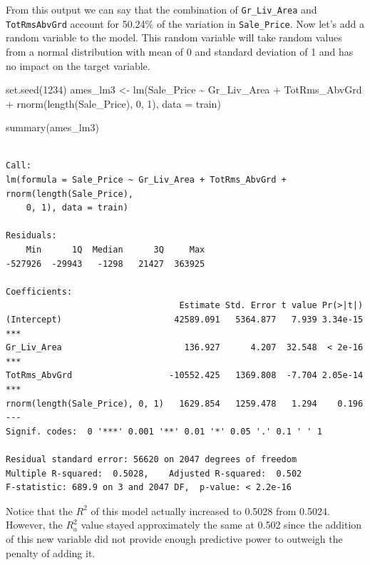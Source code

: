 \documentclass[
  letterpaper,
  DIV=11,
  numbers=noendperiod]{scrreprt}
\newenvironment{Shaded}{\begin{snugshade}}{\end{snugshade}}
\newcommand{\AttributeTok}[1]{\textcolor[rgb]{0.40,0.45,0.13}{#1}}
\newcommand{\DecValTok}[1]{\textcolor[rgb]{0.68,0.00,0.00}{#1}}
\newcommand{\FunctionTok}[1]{\textcolor[rgb]{0.28,0.35,0.67}{#1}}
\newcommand{\NormalTok}[1]{\textcolor[rgb]{0.00,0.23,0.31}{#1}}
\newcommand{\OtherTok}[1]{\textcolor[rgb]{0.00,0.23,0.31}{#1}}
\newcommand{\SpecialCharTok}[1]{\textcolor[rgb]{0.37,0.37,0.37}{#1}}
\begin{document}
From this output we can say that the combination of
\texttt{Gr\_Liv\_Area} and \texttt{TotRmsAbvGrd} account for 50.24\% of
the variation in \texttt{Sale\_Price}. Now let's add a random variable
to the model. This random variable will take random values from a normal
distribution with mean of 0 and standard deviation of 1 and has no
impact on the target variable.

\begin{Shaded}
\begin{Highlighting}[]
\FunctionTok{set.seed}\NormalTok{(}\DecValTok{1234}\NormalTok{)}
\NormalTok{ames\_lm3 }\OtherTok{\textless{}{-}} \FunctionTok{lm}\NormalTok{(Sale\_Price }\SpecialCharTok{\textasciitilde{}}\NormalTok{ Gr\_Liv\_Area }\SpecialCharTok{+}\NormalTok{ TotRms\_AbvGrd }\SpecialCharTok{+} \FunctionTok{rnorm}\NormalTok{(}\FunctionTok{length}\NormalTok{(Sale\_Price), }\DecValTok{0}\NormalTok{, }\DecValTok{1}\NormalTok{), }\AttributeTok{data =}\NormalTok{ train)}

\FunctionTok{summary}\NormalTok{(ames\_lm3)}
\end{Highlighting}
\end{Shaded}

\begin{verbatim}

Call:
lm(formula = Sale_Price ~ Gr_Liv_Area + TotRms_AbvGrd + rnorm(length(Sale_Price), 
    0, 1), data = train)

Residuals:
    Min      1Q  Median      3Q     Max 
-527926  -29943   -1298   21427  363925 

Coefficients:
                                  Estimate Std. Error t value Pr(>|t|)    
(Intercept)                      42589.091   5364.877   7.939 3.34e-15 ***
Gr_Liv_Area                        136.927      4.207  32.548  < 2e-16 ***
TotRms_AbvGrd                   -10552.425   1369.808  -7.704 2.05e-14 ***
rnorm(length(Sale_Price), 0, 1)   1629.854   1259.478   1.294    0.196    
---
Signif. codes:  0 '***' 0.001 '**' 0.01 '*' 0.05 '.' 0.1 ' ' 1

Residual standard error: 56620 on 2047 degrees of freedom
Multiple R-squared:  0.5028,    Adjusted R-squared:  0.502 
F-statistic: 689.9 on 3 and 2047 DF,  p-value: < 2.2e-16
\end{verbatim}

Notice that the \(R^2\) of this model actually increased to 0.5028 from
0.5024. However, the \(R^2_a\) value stayed approximately the same at
0.502 since the addition of this new variable did not provide enough
predictive power to outweigh the penalty of adding it.
\end{document}
